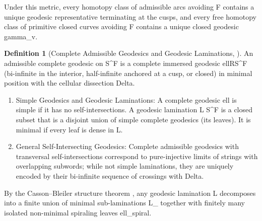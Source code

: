 \documentclass[11pt,a4paper,reqno]{amsart}
\def\({}%
\def\){}%
\def\mathcal#1{#1}%
\def\mathbb#1{#1}%
\def\mathrm#1{#1}%
\def\forb{F}%
\def\subset{\subseteq}%
\def\gamma{gamma}%
\def\ell{ell}%
\def\Delta{Delta}%
\def\emph#1{#1}%
\def\textbf#1{#1}%
\theoremstyle{definition}
\newtheorem{definition}[theorem]{Definition}
\theoremstyle{remark}
\newcommand{\R}{\mathbb{R}}
\newcommand{\forb}{\mathfrak{F}}
\begin{document}
Under this metric, every homotopy class of admissible arcs avoiding \(\forb\) contains a unique geodesic representative terminating at the cusps, and every free homotopy class of primitive closed curves avoiding \(\forb\) contains a unique closed geodesic \(\gamma_v\).

\begin{definition}[Complete Admissible Geodesics and Geodesic Laminations, \cite{Thurston1988, CassonBleiler1988}]
\label{def:geodesic_laminations}
An \emph{admissible complete geodesic} on \(\mathcal{S}^\circ \setminus \forb\) is a complete immersed geodesic \(\ell \colon \R \to \mathcal{S}^\circ \setminus \forb\) (bi-infinite in the interior, half-infinite anchored at a cusp, or closed) in minimal position with the cellular dissection \(\Delta\).
\begin{enumerate}
    \item \textbf{Simple Geodesics and Geodesic Laminations:} A complete geodesic \(\ell\) is \emph{simple} if it has no self-intersections. A \emph{geodesic lamination} \(\mathcal{L} \subset \mathcal{S}^\circ \setminus \forb\) is a closed subset that is a disjoint union of simple complete geodesics (its \emph{leaves}). It is \emph{minimal} if every leaf is dense in \(\mathcal{L}\).
    \item \textbf{General Self-Intersecting Geodesics:} Complete admissible geodesics with transversal self-intersections correspond to pure-injective limits of strings with overlapping subwords; while not simple laminations, they are uniquely encoded by their bi-infinite sequence of crossings with \(\Delta\).
\end{enumerate}
\end{definition}

By the Casson--Bleiler structure theorem \cite{CassonBleiler1988}, any geodesic lamination \(\mathcal{L}\) decomposes into a finite union of minimal sub-laminations \(\mathcal{L}_{\min}\) together with finitely many isolated non-minimal spiraling leaves \(\ell_{\mathrm{spiral}}\).
\end{document}
